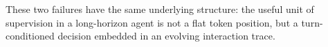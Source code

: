 These two failures have the same underlying structure: the useful unit of
supervision in a long-horizon agent is not a flat token position, but a
turn-conditioned decision embedded in an evolving interaction trace.


